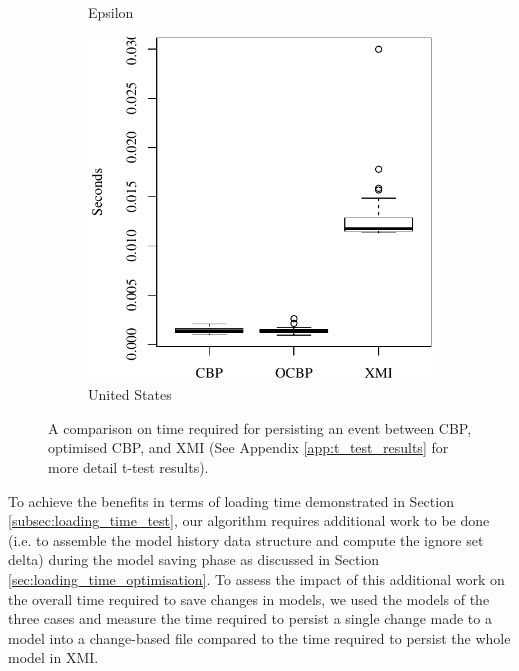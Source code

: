 \documentclass{llncs}
\begin{document}
\begin{figure}[ht]
\begin{subfigure}{0.325\textwidth}
        \caption{Epsilon}
        \label{fig:save_time_epsilon}
    \end{subfigure}
    \hfill
    \begin{subfigure}{0.325\textwidth}
        \centering
        \includegraphics[width=\linewidth]{images/save_time_wikipedia}
        \caption{United States}
        \label{fig:save_time_wikipedia}
    \end{subfigure}
    \caption{A comparison on time required for persisting an event between CBP, optimised CBP, and XMI (See Appendix \ref{app:t_test_results} for more detail t-test results).}
    \label{fig:savetime}
\end{figure}

To achieve the benefits in terms of loading time demonstrated in Section \ref{subsec:loading_time_test}, our algorithm requires additional work to be done (i.e. to assemble the model history data structure and compute the ignore set delta) during the model saving phase as discussed in Section \ref{sec:loading_time_optimisation}. To assess the impact of this additional work on the overall time required to save changes in models, we used the models of the three cases and measure the time required to persist a single change made to a model into a change-based file compared to the time required to persist the whole model in XMI. 
\end{document}
